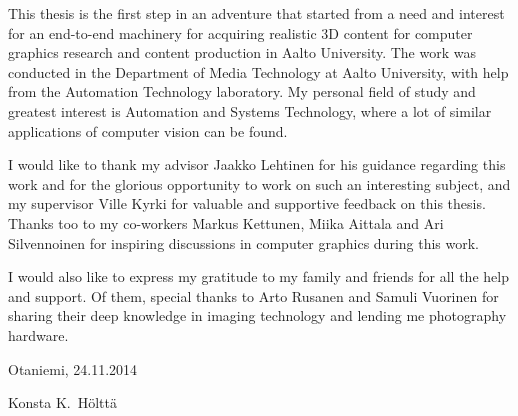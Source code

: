 This thesis is the first step in an adventure that started from a need and interest for an end-to-end machinery for acquiring realistic 3D content for computer graphics research and content production in Aalto University.
The work was conducted in the Department of Media Technology at Aalto University, with help from the Automation Technology laboratory.
My personal field of study and greatest interest is Automation and Systems Technology, where a lot of similar applications of computer vision can be found.

I would like to thank my advisor Jaakko Lehtinen for his guidance regarding this work and for the glorious opportunity to work on such an interesting subject, and my supervisor Ville Kyrki for valuable and supportive feedback on this thesis.
Thanks too to my co-workers Markus Kettunen, Miika Aittala and Ari Silvennoinen for inspiring discussions in computer graphics during this work.

I would also like to express my gratitude to my family and friends for all the help and support.
Of them, special thanks to Arto Rusanen and Samuli Vuorinen for sharing their deep knowledge in imaging technology and lending me photography hardware.


\vspace{5cm}
Otaniemi, 24.11.2014

\vspace{5mm}
{\hfill Konsta K.\ Hölttä \hspace{1cm}}
